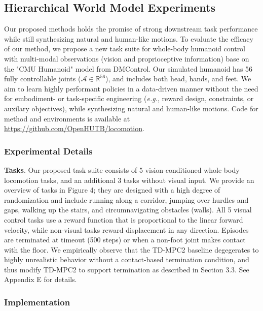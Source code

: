 \documentclass[sn-mathphys-num]{sn-jnl}%
\theoremstyle{thmstyleone}	%
\theoremstyle{thmstyletwo}	%
\theoremstyle{thmstylethree}	%
\begin{document}
\subsection{Hierarchical World Model Experiments}

Our proposed methods holds the promise of strong downstream task performance while still synthesizing natural and human-like motions.
To evaluate the efficacy of our method, we propose a new task suite for whole-body humanoid control with multi-modal observations (vision and proprioceptive information) base on the "CMU Humanoid" model from DMControl.
Our simulated humanoid has 56 fully controllable joints ($ \mathcal{A} \in \mathbb{R}^{56} $), and includes both head, hands, and feet.
We aim to learn highly performant policies in a data-driven manner without the need for embodiment- or task-specific engineering (\textit{e.g.}, reward design, constraints, or auxilary objectives), while synthesizing natural and human-like motions.
Code for method and environments is available at \href{https://github.com/OpenHUTB/locomotion}{https://github.com/OpenHUTB/locomotion}.


\subsubsection{Experimental Details}

\textbf{Tasks}.
Our proposed task suite consists of 5 vision-conditioned whole-body locomotion tasks,
and an additional 3 tasks without visual input.
We provide an overview of tasks in Figure 4;
they are designed with a high degree of randomization and include running along a corridor, jumping over hurdles and gaps, walking up the stairs, and circumnavigating obstacles (walls).
All 5 visual control tasks use a reward function that is proportional to the linear forward velocity, while non-visual tasks reward displacement in any direction.
Episodes are terminated at timeout (500 steps) or when a non-foot joint makes contact with the floor. 
We empirically observe that the TD-MPC2 baseline degegerates to highly unrealistic behavior without a contact-based termination condition, 
and thus modify TD-MPC2 to support termination as described in Section 3.3.
See Appendix E for details.


\subsubsection{Implementation}
\end{document}
